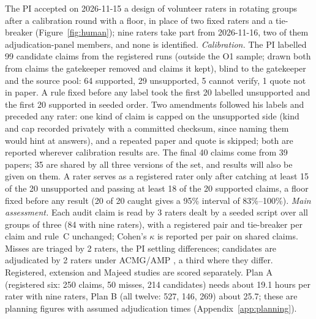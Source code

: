 \documentclass{article} %
\begin{document}
The PI accepted on 2026-11-15 a design of volunteer raters in rotating groups after a calibration round with a floor, in place of two fixed raters and a tie-breaker (Figure~\ref{fig:human}); nine raters take part from 2026-11-16, two of them adjudication-panel members, and none is identified. \emph{Calibration.} The PI labelled 99 candidate claims from the registered runs (outside the O1 sample; drawn both from claims the gatekeeper removed and claims it kept), blind to the gatekeeper and the source pool: 64 supported, 29 unsupported, 5 cannot verify, 1 quote not in paper. A rule fixed before any label took the first 20 labelled unsupported and the first 20 supported in seeded order. Two amendments followed his labels and preceded any rater: one kind of claim is capped on the unsupported side (kind and cap recorded privately with a committed checksum, since naming them would hint at answers), and a repeated paper and quote is skipped; both are reported wherever calibration results are. The final 40 claims come from 39 papers; 35 are shared by all three versions of the set, and results will also be given on them. A rater serves as a registered rater only after catching at least 15 of the 20 unsupported and passing at least 18 of the 20 supported claims, a floor fixed before any result (20 of 20 caught gives a 95\% interval of 83\%--100\%). \emph{Main assessment.} Each audit claim is read by 3 raters dealt by a seeded script over all groups of three (84 with nine raters), with a registered pair and tie-breaker per claim and rule~C unchanged; Cohen's $\kappa$ \citep{Cohen1960CoefficientAgreement} is reported per pair on shared claims. Misses are triaged by 2 raters, the PI settling differences; candidates are adjudicated by 2 raters under ACMG/AMP \citep{richards2015_acmg}, a third where they differ. Registered, extension and Majeed studies are scored separately. Plan A (registered six: 250 claims, 50 misses, 214 candidates) needs about 19.1 hours per rater with nine raters, Plan B (all twelve: 527, 146, 269) about 25.7; these are planning figures with assumed adjudication times (Appendix~\ref{app:planning}).
\end{document}
